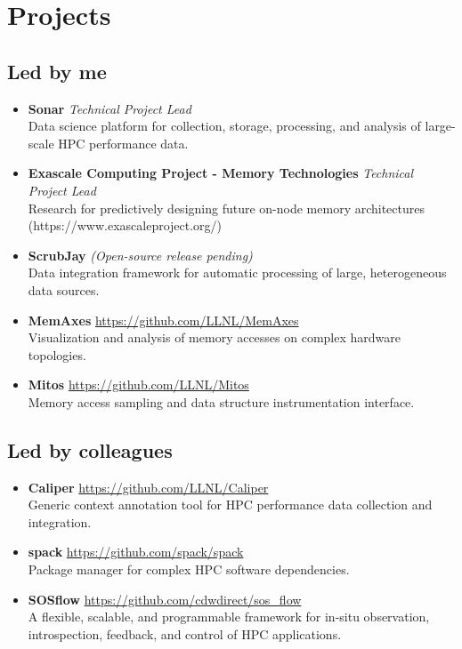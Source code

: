 \section{Projects}

\subsection{Led by me}

\begin{itemize}

\item \textbf{Sonar} \textit{Technical Project Lead}  \\
    Data science platform for collection, storage, processing, and analysis of large-scale HPC performance data.

\item \textbf{Exascale Computing Project - Memory Technologies}  \textit{Technical Project Lead} \\
    Research for predictively designing future on-node
        memory architectures (https://www.exascaleproject.org/)

\item \textbf{ScrubJay} \textit{(Open-source release pending)} \\
    Data integration framework for automatic processing of large, heterogeneous data sources.

\item \textbf{MemAxes} \url{https://github.com/LLNL/MemAxes} \\
    Visualization and analysis of memory accesses on complex hardware topologies.

\item \textbf{Mitos} \url{https://github.com/LLNL/Mitos} \\
    Memory access sampling and data structure instrumentation interface.

\end{itemize}

\subsection{Led by colleagues}

\begin{itemize}

    \item \textbf{Caliper} \url{https://github.com/LLNL/Caliper}  \\
        Generic context annotation tool for HPC performance data collection and integration.

    \item \textbf{spack} \url{https://github.com/spack/spack}  \\
        Package manager for complex HPC software dependencies.

    \item \textbf{SOSflow} \url{https://github.com/cdwdirect/sos_flow} \\
        A flexible, scalable, and programmable framework for in-situ observation, introspection, feedback, and control of HPC applications.

\end{itemize}

